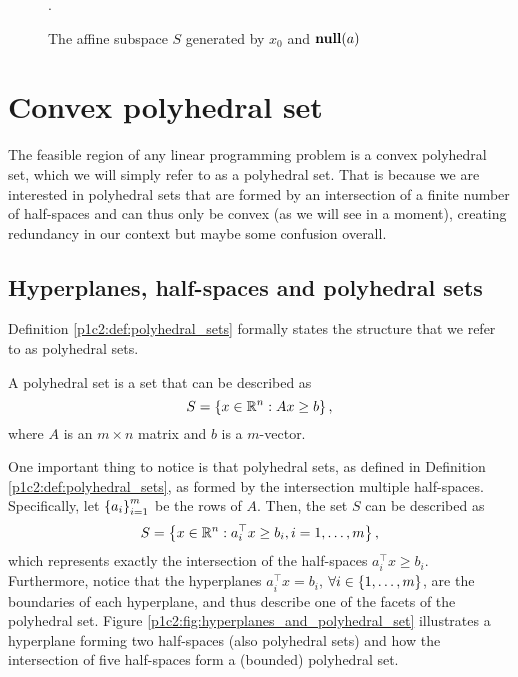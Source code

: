\begin{figure}
	\caption{The affine subspace $S$ generated by $x_0$ and $\mathop{\bf null}(a)$} \label{p1c2:fig:nill_space_a}.		
\end{figure}


\section{Convex polyhedral set}

The feasible region of any linear programming problem is a convex polyhedral set, which we will simply refer to as a polyhedral set. That is because we are interested in polyhedral sets that are formed by an intersection of a finite number of half-spaces and can thus only be convex (as we will see in a moment), creating redundancy in our context but maybe some confusion overall. 

\subsection{Hyperplanes, half-spaces and polyhedral sets}

Definition \ref{p1c2:def:polyhedral_sets} formally states the structure that we refer to as polyhedral sets.
%
\begin{definition} \label{p1c2:def:polyhedral_sets}
	A polyhedral set is a set that can be described as
	$$
	S = \left\{ x \in \mathbb{R}^n : Ax \geq b \right \},	
	$$
	where $A$ is an $m \times n$ matrix and $b$ is a $m$-vector.
\end{definition}
%
One important thing to notice is that polyhedral sets, as defined in Definition \ref{p1c2:def:polyhedral_sets}, as formed by the intersection multiple half-spaces. Specifically, let $\left\{ a_i \right \}_{i=1}^m$ be the rows of $A$. Then, the set $S$ can be described as 
%
\begin{equation}
	S = \left\{ x \in \mathbb{R}^n : a_i^\top x \geq b_i, i = 1,\dots, m \right \}, 	
\end{equation}
%
which represents exactly the intersection of the half-spaces $a_i^\top x \geq b_i$. Furthermore, notice that the hyperplanes $a_i^\top x = b_i$, $\forall i \in \left\{ 1,\dots, m \right \}$, are the boundaries of each hyperplane, and thus describe one of the facets of the polyhedral set. Figure \ref{p1c2:fig:hyperplanes_and_polyhedral_set} illustrates a hyperplane forming two half-spaces (also polyhedral sets) and how the intersection of five half-spaces form a (bounded) polyhedral set.

